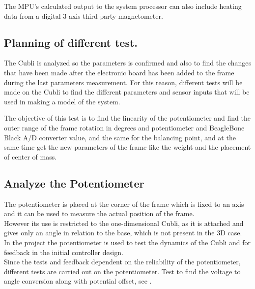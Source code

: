 The MPU’s calculated output to the system processor can also include heating data from a digital 3-axis third party magnetometer.



\subsection{Planning of different test.}
The Cubli is analyzed so the parameters is confirmed and also to find the changes that have been made after the electronic board has been added to the frame during the last parameters measurement. For this reason, different tests will be made on the Cubli to find the different parameters and sensor inputs that will be used in making a model of the system.

The objective of this test is to find the linearity of the potentiometer and find the outer range of the frame rotation in degrees and potentiometer and BeagleBone Black A/D converter value, and the same for the balancing point, and at the same time get the new parameters of the frame like the weight and the placement of center of mass.


\subsection{Analyze the Potentiometer}
The potentiometer is placed at the corner of the frame which is fixed to an axis and it can be used to measure the actual position of the frame.\\
However its use is restricted to the one-dimensional Cubli, as it is attached and gives only an angle in relation to the base, which is not present in the 3D case.\\
In the project the potentiometer is used to test the dynamics of the Cubli and for feedback in the initial controller design.\\
Since the tests and feedback dependent on the reliability of the potentiometer, different tests are carried out on the potentiometer.
Test to find the voltage to angle conversion along with potential offset, see .

